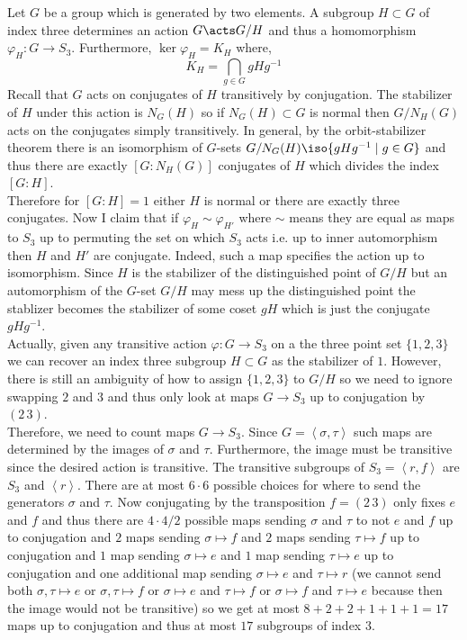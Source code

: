 \documentclass[12pt]{article}
\begin{document}
Let $G$ be a group which is generated by two elements. A subgroup $H \subset G$ of index three determines an action $G \acts G / H$ and thus a homomorphism $\varphi_H : G \to S_3$. Furthermore, $\ker{\varphi_H} = K_H$ where,
\[ K_H = \bigcap_{g \in G} g H g^{-1} \]
Recall that $G$ acts on conjugates of $H$ transitively by conjugation. The stabilizer of $H$ under this action is $N_G(H)$ so if $N_G(H) \subset G$ is normal then $G/N_H(G)$ acts on the conjugates simply transitively. In general, by the orbit-stabilizer theorem there is an isomorphism of $G$-sets $G/N_G(H) \iso \{ g H g^{-1} \mid g \in G \}$ and thus there are exactly $[G : N_H(G)]$ conjugates of $H$ which divides the index $[G : H]$. 
\bigskip\\
Therefore for $[G : H] = 1$ either $H$ is normal or there are exactly three conjugates. Now  I claim that if $\varphi_H \sim \varphi_{H'}$ where $\sim$ means they are equal as maps to $S_3$ up to permuting the set on which $S_3$ acts i.e. up to inner automorphism then $H$ and $H'$ are conjugate. Indeed, such a map specifies the action up to isomorphism. Since $H$ is the stabilizer of the distinguished point of $G / H$ but an automorphism of the $G$-set $G/H$ may mess up the distinguished point the stablizer becomes the stabilizer of some coset $g H$ which is just the conjugate $g H g^{-1}$. 
\bigskip\\
Actually, given any transitive action $\varphi : G \to S_3$ on a the three point set $\{1, 2, 3 \}$ we can recover an index three subgroup $H \subset G$ as the stabilizer of $1$. However, there is still an ambiguity of how to assign $\{ 1, 2, 3 \}$ to $G/H$ so we need to ignore swapping $2$ and $3$ and thus only look at maps $G \to S_3$ up to conjugation by $(2 \, 3)$. 
\bigskip\\
Therefore, we need to count maps $G \to S_3$. Since $G = \left< \sigma, \tau \right>$ such maps are determined by the images of $\sigma$ and $\tau$. Furthermore, the image must be transitive since the desired action is transitive. The transitive subgroups of $S_3 = \left< r, f \right>$ are $S_3$ and $\left< r \right>$. There are at most $6 \cdot 6$ possible choices for where to send the generators $\sigma$ and $\tau$. Now conjugating by the transposition $f = (2 \, 3)$ only fixes $e$ and $f$ and thus there are $4 \cdot 4 / 2$ possible maps sending $\sigma$ and $\tau$ to not $e$ and $f$ up to conjugation and $2$ maps sending $\sigma \mapsto f$ and $2$ maps sending $\tau \mapsto f$ up to conjugation and $1$ map sending $\sigma \mapsto e$ and $1$ map sending $\tau \mapsto e$ up to conjugation and one additional map sending $\sigma \mapsto e$ and $\tau \mapsto r$ (we cannot send both $\sigma, \tau \mapsto e$ or $\sigma, \tau \mapsto f$ or $\sigma \mapsto e$ and $\tau \mapsto f$ or $\sigma \mapsto f$ and $\tau \mapsto e$ because then the image would not be transitive) so we get at most $8 + 2 + 2 + 1 + 1 + 1 = 17$ maps up to conjugation and thus at most $17$ subgroups of index $3$.
\end{document}
